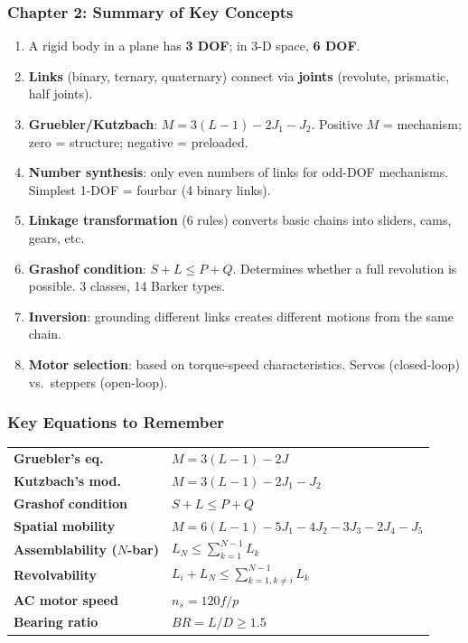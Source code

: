\documentclass[10pt,aspectratio=43]{beamer}
\begin{document}
\begin{frame}
\frametitle{Chapter 2: Summary of Key Concepts}

\begin{enumerate}
  \item A rigid body in a plane has \textbf{3 DOF}; in 3-D space, \textbf{6 DOF}.
  \item \textbf{Links} (binary, ternary, quaternary) connect via \textbf{joints} (revolute, prismatic, half joints).
  \item \textbf{Gruebler/Kutzbach}: $M = 3(L-1) - 2J_1 - J_2$. Positive $M$ = mechanism; zero = structure; negative = preloaded.
  \item \textbf{Number synthesis}: only even numbers of links for odd-DOF mechanisms. Simplest 1-DOF = fourbar (4 binary links).
  \item \textbf{Linkage transformation} (6 rules) converts basic chains into sliders, cams, gears, etc.
  \item \textbf{Grashof condition}: $S + L \leq P + Q$. Determines whether a full revolution is possible. 3 classes, 14 Barker types.
  \item \textbf{Inversion}: grounding different links creates different motions from the same chain.
  \item \textbf{Motor selection}: based on torque-speed characteristics. Servos (closed-loop) vs.\ steppers (open-loop).
\end{enumerate}
\end{frame}

\begin{frame}
\frametitle{Key Equations to Remember}

\begin{yellowbox}
\begin{tabular}{@{}ll@{}}
\textbf{Gruebler's eq.} & $M = 3(L - 1) - 2J$ \\[4pt]
\textbf{Kutzbach's mod.} & $M = 3(L - 1) - 2J_1 - J_2$ \\[4pt]
\textbf{Grashof condition} & $S + L \leq P + Q$ \\[4pt]
\textbf{Spatial mobility} & $M = 6(L-1) - 5J_1 - 4J_2 - 3J_3 - 2J_4 - J_5$ \\[4pt]
\textbf{Assemblability ($N$-bar)} & $L_N \leq \sum_{k=1}^{N-1} L_k$ \\[4pt]
\textbf{Revolvability} & $L_i + L_N \leq \sum_{k=1, k\neq i}^{N-1} L_k$ \\[4pt]
\textbf{AC motor speed} & $n_s = 120f / p$ \\[4pt]
\textbf{Bearing ratio} & $BR = L/D \geq 1.5$ \\
\end{tabular}
\end{yellowbox}
\end{frame}
\end{document}
